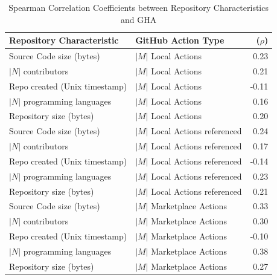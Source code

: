 \documentclass[conference]{IEEEtran}
\begin{document}
      \begin{table}[h]
          \centering
          \caption{Spearman Correlation Coefficients between Repository Characteristics and GHA}
          \label{tab:correlation_results}
          \hspace{-1cm}
          \begin{tabular}{|l|l|r|}
              \hline
              \textbf{Repository Characteristic} & \textbf{GitHub Action Type} & \textbf{(\(\rho\))} \\
              \hline
              Source Code size (bytes) & $|M|$ Local Actions & 0.23 \\
              \hline
              $|N|$ contributors &  $|M|$ Local Actions & 0.21 \\
              \hline
              Repo created (Unix timestamp) &  $|M|$ Local Actions & -0.11 \\
              \hline
              $|N|$ programming languages & $|M|$ Local Actions & 0.16 \\
              \hline
              Repository size (bytes) & $|M|$ Local Actions & 0.20 \\
              \hline
              Source Code size (bytes) & $|M|$ Local Actions referenced & 0.24 \\
              \hline
              $|N|$ contributors  & $|M|$ Local Actions referenced & 0.17 \\
              \hline
              Repo created (Unix timestamp) & $|M|$ Local Actions referenced & -0.14 \\
              \hline
              $|N|$ programming languages & $|M|$ Local Actions referenced & 0.23 \\
              \hline
              Repository size (bytes) & $|M|$ Local Actions referenced & 0.21 \\
              \hline
              Source Code size (bytes) & $|M|$ Marketplace Actions & 0.33 \\
              \hline
              $|N|$ contributors & $|M|$ Marketplace Actions & 0.30 \\
              \hline
              Repo created (Unix timestamp) & $|M|$ Marketplace Actions & -0.10 \\
              \hline
              $|N|$ programming languages & $|M|$ Marketplace Actions & 0.38 \\
              \hline
              Repository size (bytes) & $|M|$ Marketplace Actions & 0.27 \\

\end{tabular}
\end{table}
\end{document}

